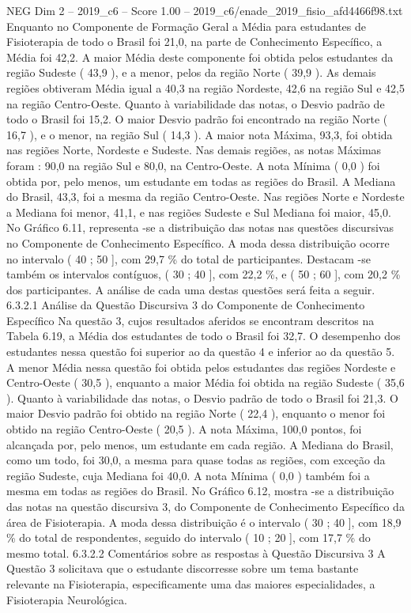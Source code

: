 \begin{textsample}{NEG Dim 2 – 2019\_c6 – Score 1.00 – 2019\_c6/enade\_2019\_fisio\_afd4466f98.txt}
Enquanto no Componente de Formação Geral a Média para estudantes de Fisioterapia de todo o Brasil foi 21,0, na parte de Conhecimento Específico, a Média foi 42,2.
A maior Média deste componente foi obtida pelos estudantes da região Sudeste ( 43,9 ), e a menor, pelos da região Norte ( 39,9 ).
As demais regiões obtiveram Média igual a 40,3 na região Nordeste, 42,6 na região Sul e 42,5 na região Centro-Oeste.
Quanto à variabilidade das notas, o Desvio padrão de todo o Brasil foi 15,2.
O maior Desvio padrão foi encontrado na região Norte ( 16,7 ), e o menor, na região Sul ( 14,3 ).
A maior nota Máxima, 93,3, foi obtida nas regiões Norte, Nordeste e Sudeste.
Nas demais regiões, as notas Máximas foram : 90,0 na região Sul e 80,0, na Centro-Oeste.
A nota Mínima ( 0,0 ) foi obtida por, pelo menos, um estudante em todas as regiões do Brasil.
A Mediana do Brasil, 43,3, foi a mesma da região Centro-Oeste.
Nas regiões Norte e Nordeste a Mediana foi menor, 41,1, e nas regiões Sudeste e Sul Mediana foi maior, 45,0.
No Gráfico 6.11, representa -se a distribuição das notas nas questões discursivas no Componente de Conhecimento Específico.
A moda dessa distribuição ocorre no intervalo ( 40 ; 50 ], com 29,7 \% do total de participantes.
Destacam -se também os intervalos contíguos, ( 30 ; 40 ], com 22,2 \%, e ( 50 ; 60 ], com 20,2 \% dos participantes.
A análise de cada uma destas questões será feita a seguir. 6.3.2.1 Análise da Questão Discursiva 3 do Componente de Conhecimento Específico Na questão 3, cujos resultados aferidos se encontram descritos na Tabela 6.19, a Média dos estudantes de todo o Brasil foi 32,7.
O desempenho dos estudantes nessa questão foi superior ao da questão 4 e inferior ao da questão 5.
A menor Média nessa questão foi obtida pelos estudantes das regiões Nordeste e Centro-Oeste ( 30,5 ), enquanto a maior Média foi obtida na região Sudeste ( 35,6 ).
Quanto à variabilidade das notas, o Desvio padrão de todo o Brasil foi 21,3.
O maior Desvio padrão foi obtido na região Norte ( 22,4 ), enquanto o menor foi obtido na região Centro-Oeste ( 20,5 ).
A nota Máxima, 100,0 pontos, foi alcançada por, pelo menos, um estudante em cada região.
A Mediana do Brasil, como um todo, foi 30,0, a mesma para quase todas as regiões, com exceção da região Sudeste, cuja Mediana foi 40,0.
A nota Mínima ( 0,0 ) também foi a mesma em todas as regiões do Brasil.
No Gráfico 6.12, mostra -se a distribuição das notas na questão discursiva 3, do Componente de Conhecimento Específico da área de Fisioterapia.
A moda dessa distribuição é o intervalo ( 30 ; 40 ], com 18,9 \% do total de respondentes, seguido do intervalo ( 10 ; 20 ], com 17,7 \% do mesmo total. 6.3.2.2 Comentários sobre as respostas à Questão Discursiva 3 A Questão 3 solicitava que o estudante discorresse sobre um tema bastante relevante na Fisioterapia, especificamente uma das maiores especialidades, a Fisioterapia Neurológica.

\end{textsample}

